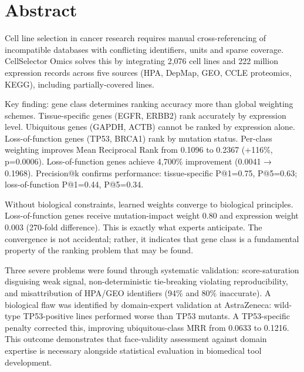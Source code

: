 \documentclass[author={Karen Coutinho, Ishaan Bhalla, Aman Raj, Dixit Kaloorani Malarmannan},
                supervisor={Dr. Daniel D'Andrea},
                degree={MSc},
                title={CellSelector Omics: A Multi-Omics Recommendation System for Cell Line Selection},
                subtitle={},
                type={},
                year={2026}]{dissertation}
\begin{document}
\let\cleardoublepage\clearpage

\maketitle

\frontmatter

\makedecl
\makedeclai

\tableofcontents
\listoffigures
\listoftables


\chapter*{Abstract}

Cell line selection in cancer research requires manual cross-referencing of incompatible databases with conflicting identifiers, units and sparse coverage. CellSelector Omics solves this by integrating 2,076 cell lines and 222 million expression records across five sources (HPA, DepMap, GEO, CCLE proteomics, KEGG), including partially-covered lines.

Key finding: gene class determines ranking accuracy more than global weighting schemes. Tissue-specific genes (EGFR, ERBB2) rank accurately by expression level. Ubiquitous genes (GAPDH, ACTB) cannot be ranked by expression alone. Loss-of-function genes (TP53, BRCA1) rank by mutation status. Per-class weighting improves Mean Reciprocal Rank from 0.1096 to 0.2367 (+116\%, p=0.0006). Loss-of-function genes achieve 4,700\% improvement (0.0041 → 0.1968). Precision@k confirms performance: tissue-specific P@1=0.75, P@5=0.63; loss-of-function P@1=0.44, P@5=0.34.

Without biological constraints, learned weights converge to biological principles. Loss-of-function genes receive mutation-impact weight 0.80 and expression weight 0.003 (270-fold difference). This is exactly what experts anticipate. The convergence is not accidental; rather, it indicates that gene class is a fundamental property of the ranking problem that may be found.

Three severe problems were found through systematic validation: score-saturation disguising weak signal, non-deterministic tie-breaking violating reproducibility, and misattribution of HPA/GEO identifiers (94\% and 80\% inaccurate). A biological flaw was identified by domain-expert validation at AstraZeneca: wild-type TP53-positive lines performed worse than TP53 mutants. A TP53-specific penalty corrected this, improving ubiquitous-class MRR from 0.0633 to 0.1216. This outcome demonstrates that face-validity assessment against domain expertise is necessary alongside statistical evaluation in biomedical tool development.
\end{document}
